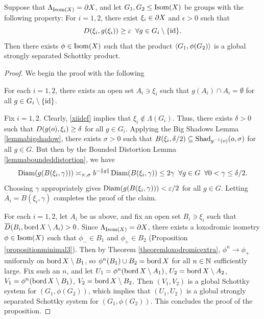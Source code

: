 \begin{proposition}
\label{propositionschottkyproduct}
Suppose that $\Lambda_{\operatorname{Isom}(X)} = \partial X$, and let $G_1,G_2\leq\operatorname{Isom}(X)$ be groups with the following property: For $i = 1,2$, there exist $\xi_i\in\partial X$ and $\epsilon > 0$ such that
\begin{equation}
\label{xiidef}
D(\xi_i,g(\xi_i)) \geq \varepsilon \;\;\forall g\in G_i\setminus\{\mathrm{id}\}.
\end{equation}
Then there exists $\phi\in\operatorname{Isom}(X)$ such that the product $\langle G_1,\phi(G_2)\rangle$ is a global strongly separated Schottky product.
\end{proposition}
\begin{proof} We begin the proof with the following
\begin{claim}
For each $i = 1,2$, there exists an open set $A_i\ni \xi_i$ such that $g(A_i)\cap A_i = \emptyset$ for all $g\in G_i\setminus\{\mathrm{id}\}$.
\end{claim}
\begin{subproof}
Fix $i = 1,2$. Clearly, \eqref{xiidef} implies that $\xi_i\notin \Lambda(G_i)$. Thus, there exists $\delta > 0$ such that $D(g(o),\xi_i)\geq \delta$ for all $g\in G_i$. Applying the Big Shadows Lemma \ref{lemmabigshadow}, there exists $\sigma > 0$ such that $B(\xi_i,\delta/2) \subseteq \operatorname{Shad}_{g^{-1}(o)}(o,\sigma)$ for all $g\in G$. But then by the Bounded Distortion Lemma \ref{lemmaboundeddistortion}, we have
\[
\operatorname{Diam}(g(B(\xi_i,\gamma))) \asymp_{\times,\sigma} b^{-\|g\|} \operatorname{Diam}(B(\xi_i,\gamma)) \leq 2\gamma \;\;\forall g\in G \;\;\forall 0 < \gamma \leq \delta/2.
\]
Choosing $\gamma$ appropriately gives $\operatorname{Diam}(g(B(\xi_i,\gamma))) < \varepsilon/2$ for all $g\in G$. Letting $A_i = B(\xi_i,\gamma)$ completes the proof of the claim.
\end{subproof}
For each $i = 1,2$, let $A_i$ be as above, and fix an open set $B_i\ni\xi_i$ such that $\overline{D}(B_i,\operatorname{bord} X\setminus A_i) > 0$. Since $\Lambda_{\operatorname{Isom}(X)} = \partial X$, there exists a loxodromic isometry $\phi\in\operatorname{Isom}(X)$ such that $\phi_-\in B_1$ and $\phi_+\in B_2$ (Proposition \ref{propositionminimal3}). Then by Theorem \ref{theoremloxodromicextra}, $\phi^n\to \phi_+$ uniformly on $\operatorname{bord} X\setminus B_1$, so $\phi^n(B_1)\cup B_2 = \operatorname{bord} X$ for all $n\in\N$ sufficiently large. Fix such an $n$, and let $U_1 = \phi^n(\operatorname{bord} X\setminus A_1)$, $U_2 = \operatorname{bord} X\setminus A_2$, $V_1 = \phi^n(\operatorname{bord} X\setminus B_1)$, $V_2 = \operatorname{bord} X\setminus B_2$. Then $(V_1,V_2)$ is a global Schottky system for $(G_1,\phi(G_2))$, which implies that $(U_1,U_2)$ is a global strongly separated Schottky system for $(G_1,\phi(G_2))$. This concludes the proof of the proposition.
\end{proof}

